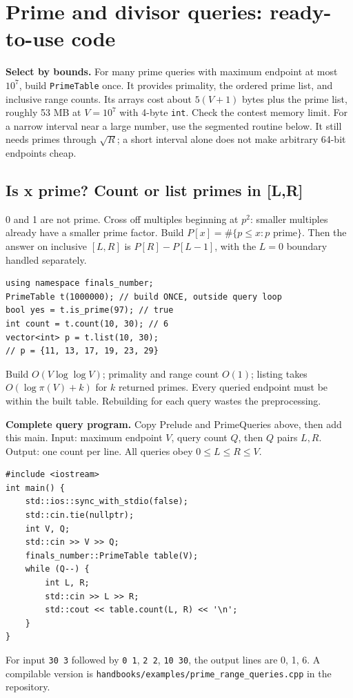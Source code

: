 \section{Prime and divisor queries: ready-to-use code}
\textbf{Select by bounds.} For many prime queries with maximum endpoint
at most $10^7$, build \texttt{PrimeTable} once. It provides primality,
the ordered prime list, and inclusive range counts. Its arrays cost about
$5(V+1)$ bytes plus the prime list, roughly 53 MB at $V=10^7$ with
4-byte \texttt{int}. Check the contest memory limit.
For a narrow interval near a large number, use the segmented routine below.
It still needs primes through $\sqrt R$; a short interval alone does not
make arbitrary 64-bit endpoints cheap.

\subsection{Is x prime? Count or list primes in [L,R]}
0 and 1 are not prime. Cross off multiples beginning at $p^2$: smaller
multiples already have a smaller prime factor. Build
$P[x]=\#\{p\le x:p\text{ prime}\}$. Then the answer on inclusive
$[L,R]$ is $P[R]-P[L-1]$, with the $L=0$ boundary handled separately.
\begin{lstlisting}
using namespace finals_number;
PrimeTable t(1000000); // build ONCE, outside query loop
bool yes = t.is_prime(97); // true
int count = t.count(10, 30); // 6
vector<int> p = t.list(10, 30);
// p = {11, 13, 17, 19, 23, 29}
\end{lstlisting}
Build $O(V\log\log V)$; primality and range count $O(1)$; listing takes
$O(\log\pi(V)+k)$ for $k$ returned primes. Every queried endpoint must be
within the built table. Rebuilding for each query wastes the preprocessing.

\textbf{Complete query program.} Copy Prelude and PrimeQueries above, then
add this main. Input: maximum endpoint $V$, query count $Q$, then $Q$ pairs
$L,R$. Output: one count per line. All queries obey $0\le L\le R\le V$.
\begin{lstlisting}
#include <iostream>
int main() {
    std::ios::sync_with_stdio(false);
    std::cin.tie(nullptr);
    int V, Q;
    std::cin >> V >> Q;
    finals_number::PrimeTable table(V);
    while (Q--) {
        int L, R;
        std::cin >> L >> R;
        std::cout << table.count(L, R) << '\n';
    }
}
\end{lstlisting}
For input \texttt{30 3} followed by \texttt{0 1}, \texttt{2 2},
\texttt{10 30}, the output lines are 0, 1, 6. A compilable version is
\texttt{handbooks/examples/prime\_range\_queries.cpp} in the repository.

